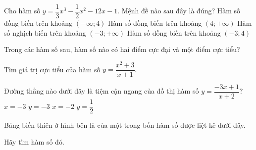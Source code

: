 \documentclass[12pt,a4paper]{article}
\begin{document}
\begin{ex}%
Cho hàm số $y=\dfrac{1}{3}x^3-\dfrac{1}{2}x^2-12x-1.$ Mệnh đề nào sau đây là đúng?
\choice
{Hàm số đồng biến trên khoảng $(-\infty;4)$}
{\True Hàm số đồng biến trên khoảng $(4;+\infty)$}
{Hàm số nghịch biến trên khoảng $(-3;+\infty)$}
{Hàm số đồng biến trên khoảng $(-3;4)$}
\end{ex}
\begin{ex}%
Trong các hàm số sau, hàm số nào có hai điểm cực đại và một điểm cực tiểu?
\end{ex}
\begin{ex}%
Tìm giá trị cực tiểu của hàm số $y=\dfrac{x^2+3}{x+1}.$
\end{ex}

\begin{ex}%
Đường thẳng nào dưới đây là tiệm cận ngang của đồ thị hàm số $y=\dfrac{-3x+1}{x+2}?$
\choice
{$x=-3$}
{\True $y=-3$}
{$x=-2$}
{$y=\dfrac{1}{2}$}
\end{ex}

\begin{ex}%
Bảng biến thiên ở hình bên là của một trong bốn hàm số được liệt kê dưới đây.
\begin{center}
\end{center} Hãy tìm hàm số đó.
\end{ex}
\end{document}

